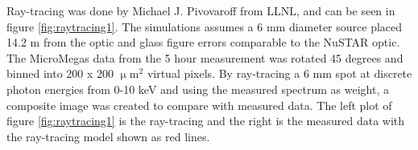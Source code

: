 

Ray-tracing was done by Michael J. Pivovaroff from LLNL, and can be seen in figure \ref{fig:raytracing1}. The simulations assumes a 6 mm diameter source placed 14.2 m from the optic and glass figure errors comparable to the NuSTAR optic. The MicroMegas data from the 5 hour measurement was rotated 45 degrees and binned into 200 x 200 $\upmu$m$^2$ virtual pixels. By ray-tracing a 6 mm spot at discrete photon energies from 0-10 keV and using the measured spectrum as weight, a composite image was created to compare with measured data. The left plot of figure \ref{fig:raytracing1} is the ray-tracing and the right is the measured data with the ray-tracing model shown as red lines.

